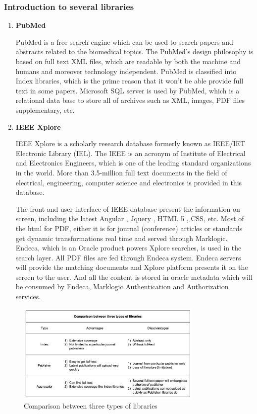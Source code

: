 \subsubsection{Introduction to several libraries }
\begin{enumerate}
	\item\textbf{PubMed}
		
	 PubMed is a free search engine which can be used to search papers and abstracts related to the biomedical topics. The PubMed’s design philosophy is based on full text XML files, which are readable by both the machine and humans and moreover technology independent. PubMed is classified into Index libraries, which is the prime reason that it won’t be able provide full text in some papers. Microsoft SQL server is used by PubMed, which is a relational data base to store all of archives such as XML, images, PDF files supplementary, etc.
	
	\item\textbf{IEEE Xplore}
	
	IEEE Xplore is a scholarly research database formerly known as IEEE/IET Electronic Library (IEL). The IEEE is an acronym of Institute of Electrical and Electronics Engineers, which is one of the leading standard organizations in the world. More than 3.5-million full text documents in the field of electrical, engineering, computer science and electronics is provided in this database. 
	
	The front and user interface of IEEE database present the information on screen, including the latest Angular , Jquery , HTML 5 , CSS, etc. Most of the html for PDF, either it is for journal (conference) articles or standards get dynamic transformations real time and served through Marklogic. Endeca, which is an Oracle product powers Xplore searches, is used in the search layer. All PDF files are fed through Endeca system. Endeca servers will provide the matching documents and Xplore platform presents it on the screen to the user. And all the content is stored in oracle metadata which will be consumed by Endeca, Marklogic Authentication and Authorization services.
	
\end{enumerate}

\begin{figure}[htb]
	\begin{center}
		\includegraphics[width=0.8\textwidth]{WolverineChart3}
	\end{center}
	\caption{Comparison between three types of libraries}
\end{figure}
\newpage
